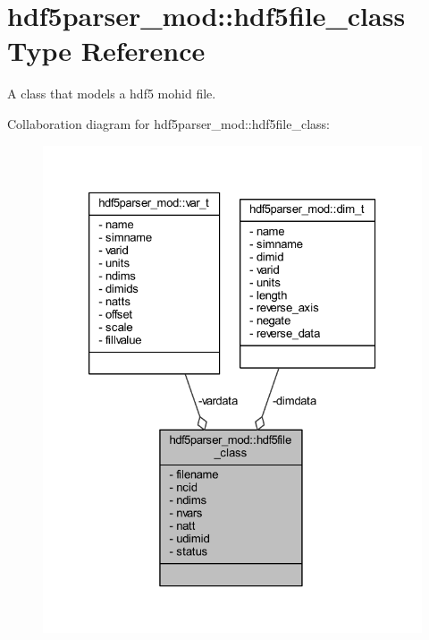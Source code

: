 \hypertarget{structhdf5parser__mod_1_1hdf5file__class}{}\section{hdf5parser\+\_\+mod\+:\+:hdf5file\+\_\+class Type Reference}
\label{structhdf5parser__mod_1_1hdf5file__class}


A class that models a hdf5 mohid file.  




Collaboration diagram for hdf5parser\+\_\+mod\+:\+:hdf5file\+\_\+class\+:\nopagebreak
\begin{figure}[H]
\begin{center}
\leavevmode
\includegraphics[width=326pt]{structhdf5parser__mod_1_1hdf5file__class__coll__graph}
\end{center}
\end{figure}
